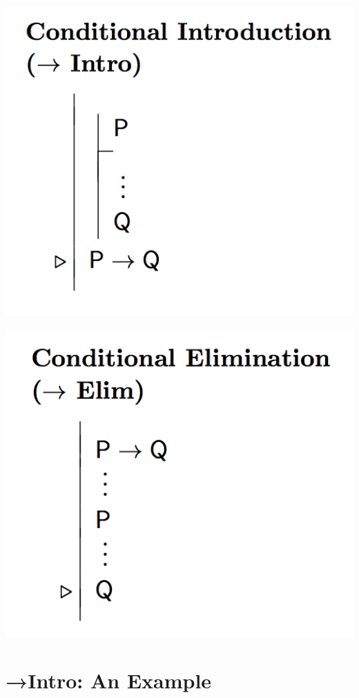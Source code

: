 \documentclass[12pt]{extarticle}
\begin{document}
\begin{multicols*}{3}
\begin{center}
\includegraphics[scale=0.3]{img/rule_arrow_intro.png}
\end{center}
\begin{center}
\includegraphics[scale=0.3]{img/rule_arrow_elim.png}
\end{center}
 
 
\section{→Intro: An Example}
 

\end{multicols*}
\end{document}
